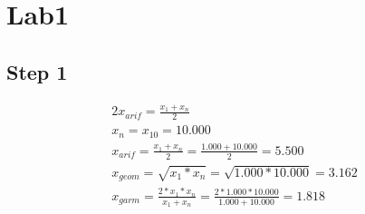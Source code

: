 \documentclass{article}%
\begin{document}
%
\normalsize%
\section{Lab1}%
\label{sec:Lab1}%
\subsection{Step 1}%
\label{subsec:Step1}%
\begin{alignat*}{2}%
x_{arif} = \frac {x_1 + x_n} 2 \\%
x_n = x_{10} = {10.000} \\%
x_{arif}
                    = \frac {x_1 + x_n} 2
                    = \frac {1.000 + 10.000} 2
                    = 5.500 \\%
x_{geom}
                    = \sqrt{x_1 * x_n}
                    = \sqrt{1.000 * 10.000}
                    = 3.162 \\%
x_{garm}
                    = \frac {2 * x_1 * x_n} {x_1 + x_n}
                    = \frac {2 * 1.000 * 10.000} {1.000 + 10.000}
                    = 1.818%
\end{alignat*}

%
\end{document}
